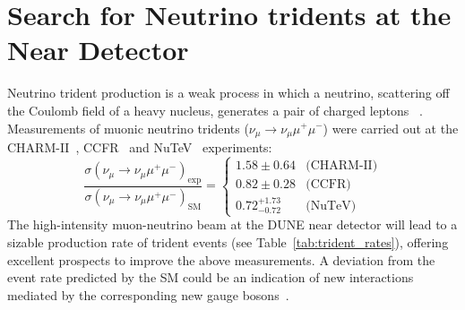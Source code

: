 \section{Search for Neutrino tridents at the Near Detector}
Neutrino trident production is a weak process in which a neutrino, scattering off the Coulomb field of a heavy nucleus, generates a pair of charged leptons ~\cite{Czyz:1964zz,Lovseth:1971vv,Fujikawa:1971nx,Koike:1971tu,Koike:1971vg,Brown:1973ih,Belusevic:1987cw}. Measurements of muonic neutrino tridents ($\nu_\mu \to \nu_\mu \mu^+\mu^-$) were carried out at the CHARM-II~\cite{Geiregat:1990gz}, CCFR~\cite{Mishra:1991bv} and NuTeV~\cite{Adams:1999mn} experiments:
\[
\frac{\sigma(\nu_\mu \to \nu_\mu \mu^+\mu^-)_\text{exp}}{\sigma(\nu_\mu \to \nu_\mu \mu^+\mu^-)_\text{SM}} = 
\begin{cases}
1.58 \pm 0.64         & \text{(CHARM-II)} \\ 
0.82 \pm 0.28         & \text{(CCFR)} \\
0.72 ^{+1.73}_{-0.72} & \text{(NuTeV)} 
\end{cases}
\]
The high-intensity muon-neutrino beam at the DUNE near detector will lead to a sizable production rate of trident events (see Table~\ref{tab:trident_rates}), offering excellent prospects to improve the above measurements. A deviation from the event rate predicted by the SM could be an indication of new interactions mediated by the corresponding new gauge bosons~\cite{Altmannshofer:2014pba}. 

